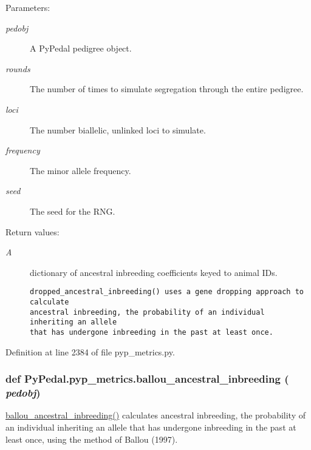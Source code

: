 \begin{Desc}
\item[Parameters:]
\begin{description}
\item[{\em pedobj}]A Py\-Pedal pedigree object. \item[{\em rounds}]The number of times to simulate segregation through the entire pedigree. \item[{\em loci}]The number biallelic, unlinked loci to simulate. \item[{\em frequency}]The minor allele frequency. \item[{\em seed}]The seed for the RNG. \end{description}
\end{Desc}
\begin{Desc}
\item[Return values:]
\begin{description}
\item[{\em A}]dictionary of ancestral inbreeding coefficients keyed to animal IDs.

\footnotesize\begin{verbatim}dropped_ancestral_inbreeding() uses a gene dropping approach to calculate
ancestral inbreeding, the probability of an individual inheriting an allele
that has undergone inbreeding in the past at least once.
\end{verbatim}
\normalsize
 \end{description}
\end{Desc}


Definition at line 2384 of file pyp\_\-metrics.py.\hypertarget{namespacePyPedal_1_1pyp__metrics_6185ce91b4815918ed935f1d4fb19714}{
\subsubsection[ballou\_\-ancestral\_\-inbreeding]{\setlength{\rightskip}{0pt plus 5cm}def Py\-Pedal.pyp\_\-metrics.ballou\_\-ancestral\_\-inbreeding ( {\em pedobj})}}
\label{namespacePyPedal_1_1pyp__metrics_6185ce91b4815918ed935f1d4fb19714}


\hyperlink{namespacePyPedal_1_1pyp__metrics_6185ce91b4815918ed935f1d4fb19714}{ballou\_\-ancestral\_\-inbreeding()} calculates ancestral inbreeding, the probability of an individual inheriting an allele that has undergone inbreeding in the past at least once, using the method of Ballou (1997). 

